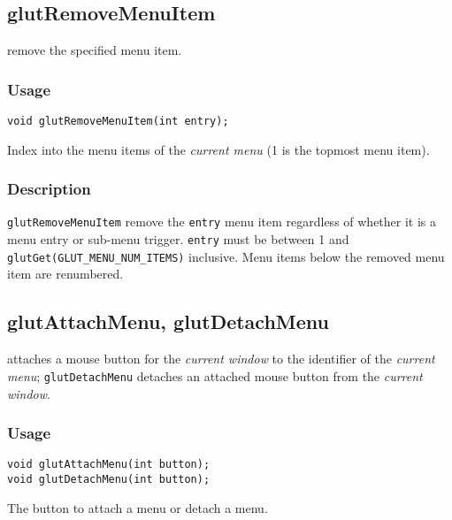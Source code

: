 \subsection{glutRemoveMenuItem}

 remove the specified menu item.

\subsubsection*{Usage}
\begin{verbatim}
void glutRemoveMenuItem(int entry);
\end{verbatim}
\begin{description}
\itemsep 0in
\item[{\tt entry}]
Index into the menu items of the {\em current menu} (1 is the topmost
menu item).
\end{description}

\subsubsection*{Description}

{\tt glutRemoveMenuItem} remove the {\tt entry} menu item regardless of whether it
is a menu entry or sub-menu trigger.
{\tt entry} must be between 1 and {\tt glutGet(GLUT\_MENU\_NUM\_ITEMS)}
inclusive.
Menu items below the removed menu item are renumbered.

\subsection{glutAttachMenu, glutDetachMenu}

 attaches a mouse button for the {\em current window} to the identifier of
the {\em current menu}; {\tt glutDetachMenu} detaches an attached mouse button from the
{\em current window}.

\subsubsection*{Usage}
\begin{verbatim}
void glutAttachMenu(int button);
void glutDetachMenu(int button);
\end{verbatim}
\begin{description}
\itemsep 0in
\item[{\tt button}]
The button to attach a menu or detach a menu.
\end{description}

